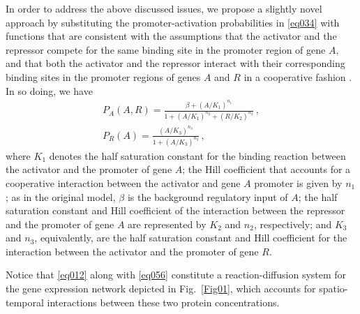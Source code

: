 \documentclass[%
 preprint,
 amsmath,amssymb,
 aps,
]{revtex4-2}
\begin{document}
	In order to address the above discussed issues, we propose a slightly novel approach by
	substituting the promoter-activation probabilities in \eqref{eq034} with functions that are consistent
	with the assumptions that the activator and the repressor compete for
	the same binding site in the promoter region of gene $A$, and that both the
	activator and the repressor interact with their corresponding binding sites in
	the promoter regions of genes $A$ and $R$ in a cooperative fashion
	\citep{Santillan2008b}. In so doing, we have
	\begin{subequations}\label{eq056}
		\begin{gather}
		P_A(A,R) = \displaystyle \frac{\beta + (A/K_1)^{n_1}}{1 + (A/K_1)^{n_2} +
			(R/K_2)^{n_2}}\,, \label{eq05} \\[3mm]
		P_R(A)  = \displaystyle \frac{(A/K_3)^{n_3}}{1 + (A/K_3)^{n_3}}\,,
		\label{eq06}
		\end{gather}
	\end{subequations}
	where $K_1$ denotes the half saturation constant for the binding reaction
	between the activator and the promoter of gene $A$; the Hill coefficient that
	accounts for a cooperative interaction between the activator and gene $A$
	promoter is given by $n_1$; as in the original model, $\beta$ is the background
	regulatory input of $A$; the half saturation constant and Hill coefficient of
	the interaction between the repressor and the promoter of gene $A$ are
	represented by $K_2$ and $n_2$, respectively; and $K_3$ and $n_3$, equivalently,
	are the half saturation constant and Hill coefficient for the interaction
	between the activator and the promoter of gene $R$. 
	
	Notice that \eqref{eq012} along with \eqref{eq056} constitute a
	reaction-diffusion system for the gene expression network depicted in
	Fig.~\ref{Fig01}, which accounts for spatio-temporal interactions between these
	two protein concentrations.
	
\end{document}
